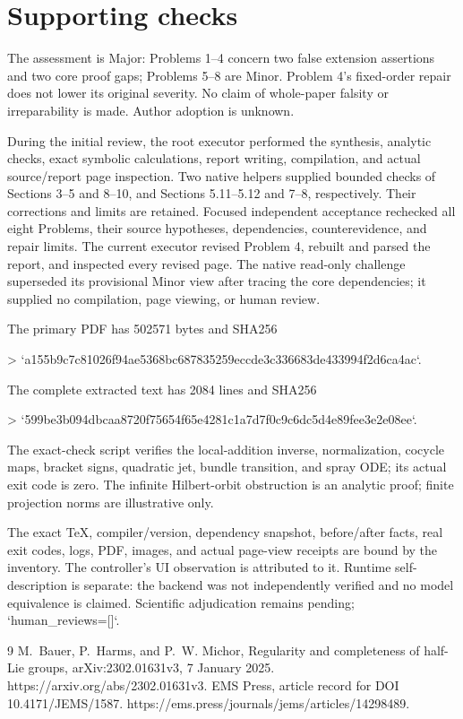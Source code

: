 \documentclass[10pt]{article}
\begin{document}
\section*{Supporting checks}
The assessment is Major: Problems 1–4 concern two false extension assertions and two core proof gaps; Problems 5–8 are Minor. Problem 4’s fixed-order repair does not lower its original severity. No claim of whole-paper falsity or irreparability is made. Author adoption is unknown.\par
During the initial review, the root executor performed the synthesis, analytic checks, exact symbolic calculations, report writing, compilation, and actual source/report page inspection. Two native helpers supplied bounded checks of Sections 3–5 and 8–10, and Sections 5.11–5.12 and 7–8, respectively. Their corrections and limits are retained. Focused independent acceptance rechecked all eight Problems, their source hypotheses, dependencies, counterevidence, and repair limits. The current executor revised Problem 4, rebuilt and parsed the report, and inspected every revised page. The native read-only challenge superseded its provisional Minor view after tracing the core dependencies; it supplied no compilation, page viewing, or human review.\par
The primary PDF has 502571 bytes and SHA256\par
> `a155b9c7c81026f94ae5368bc687835259eccde3c336683de433994f2d6ca4ac`.\par
The complete extracted text has 2084 lines and SHA256\par
> `599be3b094dbcaa8720f75654f65e4281c1a7d7f0c9c6dc5d4e89fee3e2e08ee`.\par
The exact-check script verifies the local-addition inverse, normalization, cocycle maps, bracket signs, quadratic jet, bundle transition, and spray ODE; its actual exit code is zero. The infinite Hilbert-orbit obstruction is an analytic proof; finite projection norms are illustrative only.\par
The exact TeX, compiler/version, dependency snapshot, before/after facts, real exit codes, logs, PDF, images, and actual page-view receipts are bound by the inventory. The controller’s UI observation is attributed to it. Runtime self-description is separate: the backend was not independently verified and no model equivalence is claimed. Scientific adjudication remains pending; `human\_reviews=[]`.\par
9 M. Bauer, P. Harms, and P. W. Michor, Regularity and completeness of half-Lie groups, arXiv:2302.01631v3, 7 January 2025. https://arxiv.org/abs/2302.01631v3. EMS Press, article record for DOI 10.4171/JEMS/1587. https://ems.press/journals/jems/articles/14298489.\par
\end{document}
